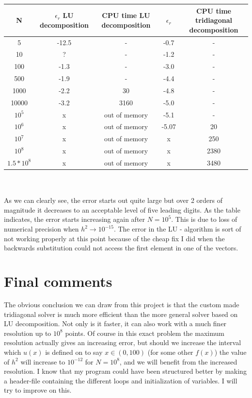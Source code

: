 \documentclass[a4paper,english, 10pt, twoside]{article}
\begin{document}
\begin{tabular}{|c|c|c|c|c|}
\hline
N & $\epsilon_r$ LU decomposition& CPU time LU decomposition &$\epsilon_r$& CPU time tridiagonal decomposition \\
\hline
5 & -12.5 & - & -0.7 & - \\
10 & ? & - & -1.2 & - \\
100 & -1.3 & - & -3.0 & - \\
500 & -1.9 & - & -4.4 & - \\
1000 & -2.2 & 30 & -4.8 & - \\
10000 & -3.2 & 3160 & -5.0 & - \\
$10^5$ & x & out of memory & -5.1 & - \\
$10^6$ & x & out of memory & -5.07 & 20 \\
$10^7$ & x & out of memory & x & 250 \\
$10^8$ & x & out of memory & x & 2380 \\
$1.5*10^8$ & x & out of memory & x & 3480 \\
\hline
\end{tabular} \\ \\


As we can clearly see, the error starts out quite large but over 2 orders of magnitude it decreases to an acceptable level of
five leading digits. As the table indicates, the error starts increasing again after $N = 10^5$. This is due to loss of 
numerical precision when $h^2 \to 10^{-15}$. The error in the LU - algorithm is sort of not working properly at this point because 
of the cheap fix I did when the backwards substitution could not access the first element in one of the vectors. 
\section*{Final comments}
The obvious conclusion we can draw from this project is that the custom made tridiagonal solver is much more efficient than the
more general solver based on LU decomposition. Not only is it faster, it can also work with a much finer resolution up to $10^8$
points. Of course in this exact problem the maximum resolution actually gives an increasing error, but should we increase the 
interval which $u(x)$ is defined on to say $x \in (0,100)$ (for some other $f(x)$) the value of $h^2$ will increase to $10^{-12}$
for $N = 10^8$, and we will benefit from the increased resolution.
I know that my program could have been structured better by making a header-file containing the different loops and initialization
of variables. I will try to improve on this.
\end{document}
